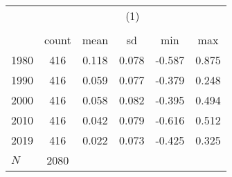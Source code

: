 {
\def\sym#1{\ifmmode^{#1}\else\(^{#1}\)\fi}
\begin{tabular}{l*{1}{ccccc}}
\toprule
            &\multicolumn{5}{c}{(1)}                                         \\
            &\multicolumn{5}{c}{}                                            \\
            &       count&        mean&          sd&         min&         max\\
\midrule
1980        &         416&       0.118&       0.078&      -0.587&       0.875\\
1990        &         416&       0.059&       0.077&      -0.379&       0.248\\
2000        &         416&       0.058&       0.082&      -0.395&       0.494\\
2010        &         416&       0.042&       0.079&      -0.616&       0.512\\
2019        &         416&       0.022&       0.073&      -0.425&       0.325\\
\midrule
\(N\)       &        2080&            &            &            &            \\
\bottomrule
\end{tabular}
}
